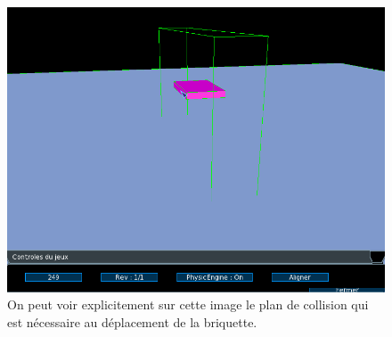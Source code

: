 \documentclass[frenchb,twoside]{EPURapport}
\begin{document}
		\newpage
		
		\begin{figure}[h]
			\centering
			\includegraphics[width=17cm]{images/move_briquette.png}
			\caption{\label{fig:move_briquette}On peut voir explicitement sur cette image le plan de collision
			qui est nécessaire au déplacement de la briquette.}
		\end{figure}
		
		
    
\end{document}
